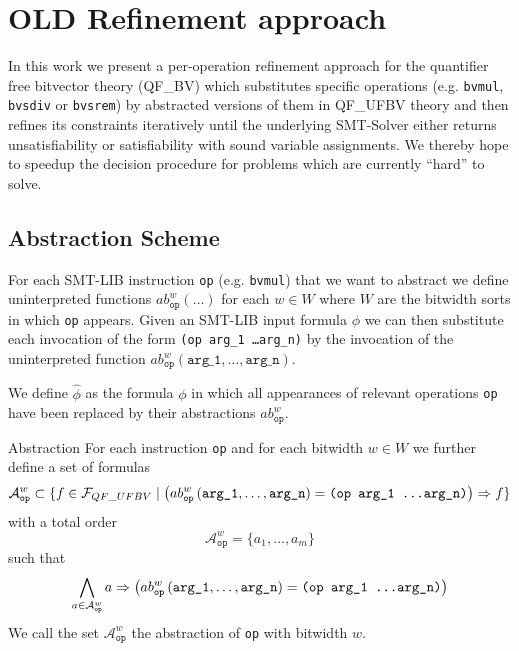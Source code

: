 \chapter{OLD Refinement approach}
\label{ch:refinement_approach}
In this work we present a per-operation refinement approach for the quantifier free bitvector theory (QF\_BV) which substitutes specific operations (e.g. \texttt{bvmul}, \texttt{bvsdiv} or \texttt{bvsrem}) by abstracted versions of them in QF\_UFBV theory and then refines its constraints iteratively until the underlying SMT-Solver either returns unsatisfiability or satisfiability with sound variable assignments. We thereby hope to speedup the decision procedure for problems which are currently \enquote{hard} to solve.

\section{Abstraction Scheme}
\label{sec:refinement_approach:abstraction_scheme}
For each SMT-LIB instruction \texttt{op} (e.g. \texttt{bvmul}) that we want to abstract we define uninterpreted functions $ab_{\texttt{op}}^w\left(\dots\right)$ for each $w\in W$ where $W$ are the bitwidth sorts in which \texttt{op} appears.
Given an SMT-LIB input formula $\phi$ we can then substitute each invocation of the form \texttt{(op arg\_1 \dots arg\_n)} by the invocation of the uninterpreted function $ab_{\texttt{op}}^w\left(\texttt{arg\_1}, \dots, \texttt{arg\_n}\right)$.

We define $\hat{\phi}$ as the formula $\phi$ in which all appearances of relevant operations \texttt{op} have been replaced by their abstractions $ab_\texttt{op}^w$.\\

\begin{definition}{Abstraction}
For each instruction \texttt{op} and for each bitwidth $w\in W$  we further define a set of formulas
\[\mathcal{A}_\texttt{op}^w \subset \{f \in \mathcal{F}_{QF\_UFBV} \mid \left( ab_{\texttt{op}}^w\left(\texttt{arg\_1}, \dots, \texttt{arg\_n}\right)=\texttt{(op arg\_1 \dots arg\_n)} \right) \Rightarrow f\}\]
with a total order
\[\mathcal{A}_\texttt{op}^w  = \{a_1, \dots, a_m\}\]
such that
\[\bigwedge\limits_{a\in\mathcal{A}_\texttt{op}^w} a \Rightarrow \left(ab_{\texttt{op}}^w\left(\texttt{arg\_1}, \dots, \texttt{arg\_n}\right)=\texttt{(op arg\_1 \dots arg\_n)}\right)\]
We call the set $\mathcal{A}_\texttt{op}^w$ the abstraction of \texttt{op} with bitwidth $w$.
\end{definition}


